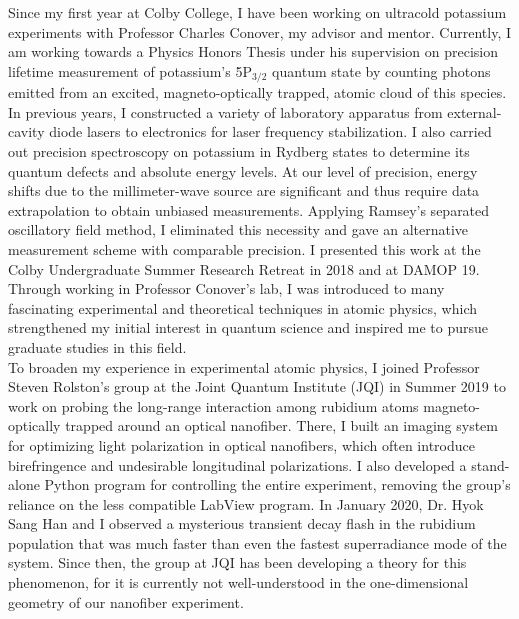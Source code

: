 Since my first year at Colby College, I have been working on ultracold potassium experiments with Professor Charles Conover, my advisor and mentor. Currently, I am working towards a Physics Honors Thesis under his supervision on precision lifetime measurement of potassium's 5P$_{\text{3/2}}$ quantum state by counting photons emitted from an excited, magneto-optically trapped, atomic cloud of this species. In previous years, I constructed a variety of laboratory apparatus from external-cavity diode lasers to electronics for laser frequency stabilization. I also carried out precision spectroscopy on potassium in Rydberg states to determine its quantum defects and absolute energy levels. At our level of precision, energy shifts due to the millimeter-wave source are significant and thus require data extrapolation to obtain unbiased measurements. Applying Ramsey's separated oscillatory field method, I eliminated this necessity and gave an alternative measurement scheme with comparable precision. I presented this work at the Colby Undergraduate Summer Research Retreat in 2018 and at DAMOP 19. Through working in Professor Conover's lab, I was introduced to many fascinating experimental and theoretical techniques in atomic physics, which strengthened my initial interest in quantum science and inspired me to pursue graduate studies in this field.  \\


To broaden my experience in experimental atomic physics, I joined Professor Steven Rolston's group at the Joint Quantum Institute (JQI) in Summer 2019 to work on probing the long-range interaction among rubidium atoms magneto-optically trapped around an optical nanofiber. There, I built an imaging system for optimizing light polarization in optical nanofibers, which often introduce birefringence and undesirable longitudinal polarizations. I also developed a stand-alone Python program for controlling the entire experiment, removing the group's reliance on the less compatible LabView program. In January 2020, Dr. Hyok Sang Han and I observed a mysterious transient decay flash in the rubidium population that was much faster than even the fastest superradiance mode of the system.  Since then, the group at JQI has been developing a theory for this phenomenon, for it is currently not well-understood in the one-dimensional geometry of our nanofiber experiment. \\ 


